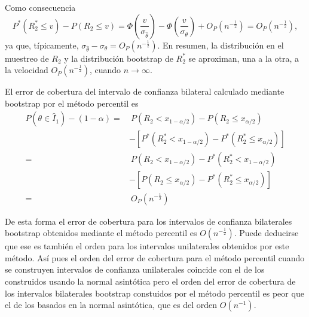 \documentclass[
]{book}
\theoremstyle{break}
\theoremstyle{nonumberplain}
\begin{document}
Como consecuencia
\[P^{\ast}\left( R_2^{\ast}\leq v \right) -P\left( R_2\leq v \right) =\Phi
\left( \frac{v}{\sigma _{\hat{\theta}}} \right) -\Phi \left( \frac{v}{\sigma
_{\theta }} \right) +O_{P}\left( n^{-\frac{1}{2}} \right) =O_{P}\left( n^{-
\frac{1}{2}} \right),\]
ya que, típicamente, \(\sigma _{\hat{\theta}}-\sigma _{\theta}
= O_{P}\left( n^{-\frac{1}{2}} \right)\). En resumen, la distribución en
el muestreo de \(R_2\) y la distribución bootstrap de \(R_2^{\ast}\) se
aproximan, una a la otra, a la velocidad \(O_{P}\left( n^{-\frac{1}{2}
} \right)\), cuando \(n\rightarrow \infty\).

El error de cobertura del intervalo de confianza bilateral calculado
mediante bootstrap por el método percentil es
\[\begin{aligned}
P\left( \theta \in \hat{I}_1 \right) -\left( 1-\alpha \right) =&\ P\left(
R_2<x_{1-\alpha /2} \right) -P\left( R_2\leq x_{\alpha /2} \right) \\
&-\left[ P^{\ast}\left( R_2^{\ast}<x_{1-\alpha /2} \right) -P^{\ast
}\left( R_2^{\ast}\leq x_{\alpha /2} \right) \right] \\
=&\ P\left( R_2<x_{1-\alpha /2} \right) -P^{\ast}\left( R_2^{\ast
}<x_{1-\alpha /2} \right) \\
&-\left[ P\left( R_2\leq x_{\alpha /2} \right) -P^{\ast}\left(
R_2^{\ast}\leq x_{\alpha /2} \right) \right] \\
=&\ O_{P}\left( n^{-\frac{1}{2}} \right)
\end{aligned}\]

De esta forma el error de cobertura para los intervalos de confianza
bilaterales bootstrap obtenidos mediante el método percentil es \(O\left(
n^{-\frac{1}{2}} \right)\). Puede deducirse que ese es también el orden
para los intervalos unilaterales obtenidos por este método. Así pues el
orden del error de cobertura para el método percentil cuando se
construyen intervalos de confianza unilaterales coincide con el de los
construidos usando la normal asintótica pero el orden del error de
cobertura de los intervalos bilaterales bootstrap constuidos por el
método percentil es peor que el de los basados en la normal asintótica,
que es del orden \(O\left( n^{-1} \right)\).
\end{document}
